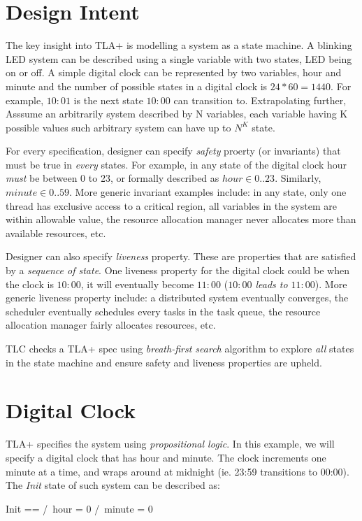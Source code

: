 \documentclass{report}
\begin{document}
\section{Design Intent}

The key insight into TLA+ is modelling a system as a state machine. A blinking
LED system can be described using a single variable with two states, LED being
on or off. A simple digital clock can be represented by two variables, hour and
minute and the number of possible states in a digital clock is $24 * 60 = 1440$.
For example, $10:01$ is the next state $10:00$ can transition to.  Extrapolating
further, Asssume an arbitrarily system described by N variables, each variable
having K possible values such arbitrary system can have up to $N^K$
state.\newline

For every specification, designer can specify \textit{safety} proerty (or
invariants) that must be true in \textit{every} states. For example, in any
state of the digital clock hour \textit{must} be between 0 to 23, or formally
described as $hour \in 0..23$.  Similarly, $minute \in 0..59$. More generic
invariant examples include: in any state, only one thread has exclusive access
to a critical region, all variables in the system are within allowable value,
the resource allocation manager never allocates more than available resources,
etc. \newline

Designer can also specify \textit{liveness} property. These are properties that
are satisfied by a \textit{sequence of state}. One liveness property for the
digital clock could be when the clock is $10:00$, it will eventually become
$11:00$ (\textit{$10:00$ leads to $11:00$}). More generic liveness property
include: a distributed system eventually converges, the scheduler eventually
schedules every tasks in the task queue, the resource allocation manager fairly
allocates resources, etc. \newline

TLC checks a TLA+ spec using \textit{breath-first search} algorithm to explore
\textit{all} states in the state machine and ensure safety and liveness
properties are upheld.

\section{Digital Clock}

TLA+ specifies the system using \textit{propositional logic}. In this example, 
we will specify a digital clock that has hour and minute. The clock increments 
one minute at a time, and wraps around at midnight (ie. 23:59 transitions to
00:00). The \textit{Init} state of such system can be described as: \newline
\begin{tla}
    Init ==
        /\ hour = 0
        /\ minute = 0
\end{tla}
\begin{tlatex}
%
%
%
\end{tlatex}
 \newline
\end{document}
